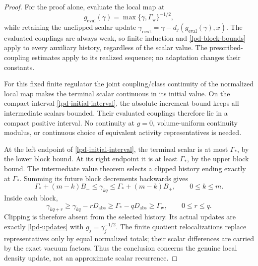 \begin{proof}
For the proof alone, evaluate the local map at
\begin{equation}
 g_{\mathrm{eval}}(\gamma)
             =\max\{\gamma,\Gamma_{\mathrm w}\}^{-1/2},
 \label{lpd-clipped-coupling}
\end{equation}
while retaining the unclipped scalar update
\(\gamma_{\mathrm{next}}
 =\gamma-d_j(g_{\mathrm{eval}}(\gamma),x)\).
The evaluated couplings are always weak, so finite induction and
\eqref{lpd-block-bounds} apply to every auxiliary history, regardless
of the scalar value. The prescribed-coupling estimates apply to
its realized sequence; no adaptation changes their constants.

For this fixed finite regulator the joint coupling/class continuity
of the normalized local map makes the terminal scalar continuous
in its initial value. On the compact interval
\eqref{lpd-initial-interval}, the absolute increment bound keeps
all intermediate scalars bounded. Their evaluated couplings
therefore lie in a compact positive interval. No continuity at
\(g=0\), volume-uniform continuity modulus, or continuous choice
of equivalent activity representatives is needed.

At the left endpoint of \eqref{lpd-initial-interval}, the terminal
scalar is at most \(\Gamma_*\), by the lower block bound. At its
right endpoint it is at least \(\Gamma_*\), by the upper block
bound. The intermediate value theorem selects a clipped history
ending exactly at \(\Gamma_*\). Summing its future block decrements
backwards gives
\begin{equation}
 \Gamma_*+(m-k)B_-\le\gamma_{kq}
                   \le\Gamma_*+(m-k)B_+,
 \qquad 0\le k\le m.
 \label{lpd-block-endpoints}
\end{equation}
Inside each block,
\begin{equation}
 \gamma_{kq+r}\ge\gamma_{kq}-rD_{\mathrm{abs}}
       \ge\Gamma_*-qD_{\mathrm{abs}}
       \ge\Gamma_{\mathrm w},
 \qquad 0\le r\le q.
 \label{lpd-clipping-absent}
\end{equation}
Clipping is therefore absent from the selected history.
Its actual updates are exactly \eqref{lpd-updates} with
\(g_j=\gamma_j^{-1/2}\). The finite quotient relocalizations
replace representatives only by equal normalized totals; their
scalar differences are carried by the exact vacuum factors.
Thus the conclusion concerns the genuine local density update,
not an approximate scalar recurrence.
\end{proof}

